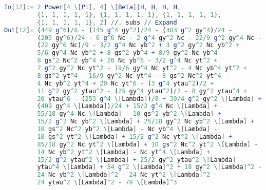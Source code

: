 \documentclass{scrartcl}
\begin{document}
\begin{lstlisting}[language=mathematica,mathescape,columns=flexible,backgroundcolor=\color{light-gray}]
In[12]:= 2 Power[4 \[Pi], 4] \[Beta][H, H, H, H, 
         {1, 1, 1, 1, 1}, {1, 1, 1, 1, 1}, {1, 1, 1, 1, 1}, 
         {1, 1, 1, 1, 1}, 2] //. subs // Expand         
Out[12]= (449 g^6)/8 - (145 g^4 gy^2)/24 - (383 g^2 gy^4)/24 - 
         (203 gy^6)/24 - 6 g^6 Nc - 2 g^4 gy^2 Nc - 22/9 g^2 gy^4 Nc - 
         (22 gy^6 Nc)/9 - 3/2 g^4 Nc yb^2 + 3 g^2 gy^2 Nc yb^2 + 
         5/6 gy^4 Nc yb^2 + 8 gs^2 yb^4 + 8/9 gy^2 Nc yb^4 - 
         8 gs^2 Nc^2 yb^4 + 20 Nc yb^6 - 3/2 g^4 Nc yt^2 + 
         7 g^2 gy^2 Nc yt^2 - 19/6 gy^4 Nc yt^2 - 4 Nc yb^4 yt^2 + 
         8 gs^2 yt^4 - 16/9 gy^2 Nc yt^4 - 8 gs^2 Nc^2 yt^4 - 
         4 Nc yb^2 yt^4 + 20 Nc yt^6 - (3 g^4 ytau^2)/2 + 
         11 g^2 gy^2 ytau^2 - (25 gy^4 ytau^2)/2 - 8 gy^2 ytau^4 + 
         20 ytau^6 - (253 g^4 \[Lambda])/8 + 39/4 g^2 gy^2 \[Lambda] + 
         (409 gy^4 \[Lambda])/24 + 15/2 g^4 Nc \[Lambda] + 
         55/18 gy^4 Nc \[Lambda] - 10 gs^2 yb^2 \[Lambda] + 
         15/2 g^2 Nc yb^2 \[Lambda] + 25/18 gy^2 Nc yb^2 \[Lambda] + 
         10 gs^2 Nc^2 yb^2 \[Lambda] - Nc yb^4 \[Lambda] - 
         10 gs^2 yt^2 \[Lambda] + 15/2 g^2 Nc yt^2 \[Lambda] + 
         85/18 gy^2 Nc yt^2 \[Lambda] + 10 gs^2 Nc^2 yt^2 \[Lambda] - 
         14 Nc yb^2 yt^2 \[Lambda] - Nc yt^4 \[Lambda] + 
         15/2 g^2 ytau^2 \[Lambda] + 25/2 gy^2 ytau^2 \[Lambda] - 
         ytau^4 \[Lambda] + 54 g^2 \[Lambda]^2 + 18 gy^2 \[Lambda]^2 - 
         24 Nc yb^2 \[Lambda]^2 - 24 Nc yt^2 \[Lambda]^2 - 
         24 ytau^2 \[Lambda]^2 - 78 \[Lambda]^3
         
\end{lstlisting}
\newpage
\printbibliography
\end{document}
